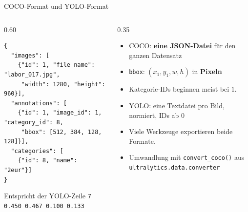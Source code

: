 \begin{frame}[fragile]{COCO-Format und YOLO-Format}
\footnotesize
\begin{columns}
\begin{column}{0.60\textwidth}
{\footnotesize
\begin{verbatim}
{
  "images": [
    {"id": 1, "file_name": "labor_017.jpg",
     "width": 1280, "height": 960}],
  "annotations": [
    {"id": 1, "image_id": 1, "category_id": 8,
     "bbox": [512, 384, 128, 128]}],
  "categories": [
    {"id": 8, "name": "2eur"}]
}
\end{verbatim}
}
Entspricht der YOLO-Zeile \texttt{7 0.450 0.467 0.100 0.133}
\end{column}
\begin{column}{0.35\textwidth}
\begin{itemize}
  \item COCO: \textbf{eine JSON-Datei} für den ganzen Datensatz
  \item \texttt{bbox}: $(x_1, y_1, w, h)$ in \textbf{Pixeln}
  \item Kategorie-IDs beginnen meist bei $1$.
  \item YOLO: eine Textdatei pro Bild, normiert, IDs ab $0$
  \item Viele Werkzeuge exportieren beide Formate.
  \item Umwandlung mit \texttt{convert\_coco()} aus \texttt{ultralytics.data.converter}
\end{itemize}
\end{column}
\end{columns}
\end{frame}
